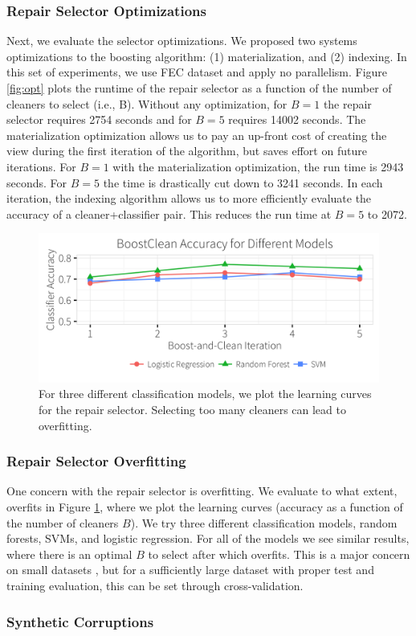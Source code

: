  \subsubsection{Repair Selector Optimizations}
 Next, we evaluate the selector optimizations. We proposed two systems optimizations to the boosting algorithm: (1) materialization, and (2) indexing.
 In this set of experiments, we use FEC dataset and apply no parallelism.
 Figure \ref{fig:opt} plots the runtime of the repair selector as a function of the number of cleaners to select (i.e., B).
 Without any optimization, for $B=1$ the repair selector requires 2754 seconds and for $B=5$ requires 14002 seconds.
 The materialization optimization allows us to pay an up-front cost of creating the view during the first iteration of the algorithm, but saves effort on future iterations.
 For $B=1$ with the materialization optimization, the run time is 2943 seconds.
 For $B=5$ the time is drastically cut down to 3241 seconds.
 In each iteration, the indexing algorithm allows us to more efficiently evaluate the accuracy of a cleaner+classifier pair.
 This reduces the run time at $B=5$ to 2072.
 
 \begin{figure}[t]
\centering
 \includegraphics[width=0.9\columnwidth]{exp/learn.png}
 \caption{For three different classification models, we plot the learning curves for the repair selector. Selecting too many cleaners can lead to overfitting.
 \label{fig:learning}}
\end{figure}
 
 \subsubsection{Repair Selector Overfitting}
 One concern with the repair selector is overfitting. We evaluate to what extent, \sys overfits in Figure \ref{fig:learning}, where we plot the learning curves (accuracy as a function of the number of cleaners $B$).
 We try three different classification models, random forests, SVMs, and logistic regression.
 For all of the models we see similar results, where there is an optimal $B$ to select after which \sys overfits.
This is a major concern on small datasets , but for a sufficiently large dataset with proper test and training evaluation, this can be set through cross-validation. 

\subsubsection{Synthetic Corruptions}

 



